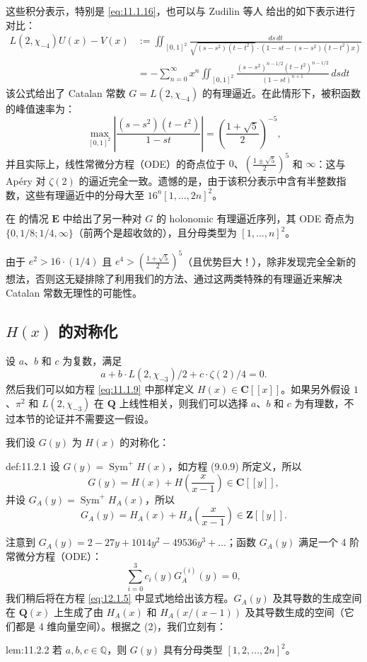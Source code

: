 \begin{remark}\label{rem:11.1.17}
这些积分表示，特别是 \eqref{eq:11.1.16}，也可以与 Zudilin 等人 \cite{Zud03}\cite{Riv06}\cite{Nes16} 给出的如下表示进行对比：
\[ \begin{aligned} L(2,\chi_{-4})U(x) - V(x) &:= \iint_{[0,1]^2} \frac{ds\,dt}{\sqrt{(s-s^2)(t-t^2)} \cdot \left(1-st-(s-s^2)(t-t^2)x\right)} \\ &= -\sum_{n=0}^{\infty} x^n \iint_{[0,1]^2} \frac{(s-s^2)^{n-1/2}(t-t^2)^{n-1/2}}{(1-st)^{n+1}} \, ds dt \end{aligned} \]
该公式给出了 Catalan 常数 $G = L(2, \chi_{-4})$ 的有理逼近。在此情形下，被积函数的峰值速率为：
\[ \max_{[0,1]^2} \left| \frac{(s-s^2)(t-t^2)}{1-st} \right| = \left( \frac{1+\sqrt{5}}{2} \right)^{-5}, \]
并且实际上，线性常微分方程（ODE）的奇点位于 $0$、$\left(\frac{1\pm\sqrt{5}}{2}\right)^5$ 和 $\infty$：这与 Ap{\'e}ry 对 $\zeta(2)$ 的逼近完全一致。遗憾的是，由于该积分表示中含有半整数指数，这些有理逼近中的分母大至 $16^n[1,\dots,2n]^2$。

在 \cite{Zag09} 的情况 $\mathbf{E}$ 中给出了另一种对 $G$ 的 holonomic 有理逼近序列，其 ODE 奇点为 $\{0, 1/8; 1/4, \infty\}$（前两个是超收敛的），且分母类型为 $[1, \dots, n]^2$。

由于 $e^2 > 16 \cdot (1/4)$ 且 $e^4 > \left(\frac{1+\sqrt{5}}{2}\right)^5$（且优势巨大！），除非发现完全全新的想法，否则这无疑排除了利用我们的方法、通过这两类特殊的有理逼近来解决 Catalan 常数无理性的可能性。
\end{remark}

\subsection{$H(x)$ 的对称化}\label{sec:11.2}

设 $a$、$b$ 和 $c$ 为复数，满足
\[ a + b \cdot L(2, \chi_{-3})/2 + c \cdot \zeta(2)/4 = 0. \]
然后我们可以如方程 \eqref{eq:11.1.9} 中那样定义 $H(x) \in \mathbf{C}[\! [x]\!]$。如果另外假设 $1$、$\pi^2$ 和 $L(2,\chi_{-3})$ 在 $\mathbf{Q}$ 上线性相关，则我们可以选择 $a$、$b$ 和 $c$ 为有理数，不过本节的论证并不需要这一假设。

我们设 $G(y)$ 为 $H(x)$ 的对称化：

\begin{mydef}{}{def:11.2.1}
设 $G(y) = \operatorname{Sym}^+ H(x)$，如方程 (9.0.9) 所定义，所以
\[ G(y) = H(x) + H\left(\frac{x}{x-1}\right) \in \mathbf{C}[\! [y]\!], \]
并设 $G_A(y) = \operatorname{Sym}^+ H_A(x)$，所以
\[ G_A(y) = H_A(x) + H_A\left(\frac{x}{x-1}\right) \in \mathbf{Z}[\! [y]\!]. \]
\end{mydef}

注意到 $G_A(y) = 2 - 27y + 1014y^2 - 49536y^3 + \dots$；函数 $G_A(y)$ 满足一个 4 阶常微分方程（ODE）：
\[ \sum_{i=0}^{3} c_i(y) G_A^{(i)}(y) = 0, \]
我们稍后将在方程 \eqref{eq:12.1.5} 中显式地给出该方程。$G_A(y)$ 及其导数的生成空间在 $\mathbf{Q}(x)$ 上生成了由 $H_A(x)$ 和 $H_A(x/(x-1))$ 及其导数生成的空间（它们都是 4 维向量空间）。根据之 (2)，我们立刻有：

\begin{mylemma}{}{lem:11.2.2}
若 $a, b, c \in \mathbb{Q}$，则 $G(y)$ 具有分母类型 $[1, 2, \dots, 2n]^2$。
\end{mylemma}

